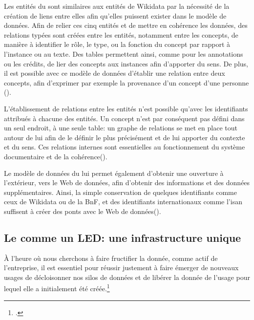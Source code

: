 Les entités du \ldd sont similaires aux entités de Wikidata par la nécessité de la création de liens entre elles afin qu'elles puissent exister dans le modèle de données. Afin de relier ces cinq entités et de mettre en cohérence les données, des relations typées sont créées entre les entités, notamment entre les concepts, de manière à identifier le rôle, le type, ou la fonction du concept par rapport à l'instance ou au texte. Des tables permettent ainsi, comme pour les annotations ou les crédits, de lier des concepts aux instances afin d'apporter du sens. De plus, il est possible avec ce modèle de données d'établir une relation entre deux concepts, afin d'exprimer par exemple la provenance d'un concept d'une personne (). 


L'établissement de relations entre les entités n'est possible qu'avec les identifiants attribués à chacune des entités. Un concept n'est par conséquent pas défini dans un seul endroit, à une seule table: un graphe de relations se met en place tout autour de lui afin de le définir le plus précisément et de lui apporter du contexte et du sens. Ces relations internes sont essentielles au fonctionnement du système documentaire et de la cohérence().


Le modèle de données du \ldd lui permet également d'obtenir une ouverture à l'extérieur, vers le Web de données, afin d'obtenir des informations et des données supplémentaires. Ainsi, la simple conservation de quelques identifiants comme ceux de Wikidata ou de la BnF, et des identifiants internationaux comme l'\ac{isan} suffisent à créer des ponts avec le Web de données().


\subsection{\label{III-B-2-c}Le \ldd comme un LED: une infrastructure unique}

\begin{citationLongue}
	À l’heure où nous cherchons à faire fructifier la donnée, comme actif de l’entreprise, il est essentiel pour réussir justement à faire émerger de nouveaux usages de décloisonner nos silos de données et de libérer la donnée de l’usage pour lequel elle a initialement été créée.\footcite{poupeau_reflexions_2018}
\end{citationLongue}

